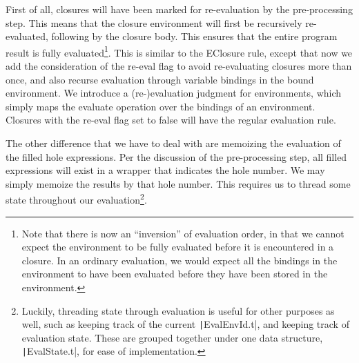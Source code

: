 First of all, closures will have been marked for re-evaluation by the pre-processing step. This means that the closure environment will first be recursively re-evaluated, following by the closure body. This ensures that the entire program result is fully evaluated\footnote{Note that there is now an ``inversion'' of evaluation order, in that we cannot expect the environment to be fully evaluated before it is encountered in a closure. In an ordinary evaluation, we would expect all the bindings in the environment to have been evaluated before they have been stored in the environment.}. This is similar to the EClosure rule, except that now we add the consideration of the re-eval flag to avoid re-evaluating closures more than once, and also recurse evaluation through variable bindings in the bound environment. We introduce a (re-)evaluation judgment for environments, which simply maps the evaluate operation over the bindings of an environment. Closures with the re-eval flag set to false will have the regular evaluation rule.

\begin{singlespace}
\end{singlespace}


The other difference that we have to deal with are memoizing the evaluation of the filled hole expressions. Per the discussion of the pre-processing step, all filled expressions will exist in a wrapper that indicates the hole number. We may simply memoize the results by that hole number. This requires us to thread some state throughout our evaluation\footnote{Luckily, threading state through evaluation is useful for other purposes as well, such as keeping track of the current \texttt|EvalEnvId.t|, and keeping track of evaluation state. These are grouped together under one data structure, \texttt|EvalState.t|, for ease of implementation.}.

